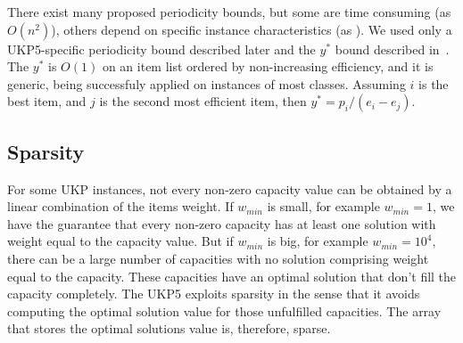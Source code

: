 \documentclass[runningheads,a4paper]{llncs}
\begin{document}
There exist many proposed periodicity bounds, but some are time consuming (as \(O(n^2)\)\cite{badbound1}), others depend on specific instance characteristics (as \cite{badbound2}\cite{pya}).
We used only a UKP5-specific periodicity bound described later and the \(y^{*}\) bound described in~\cite[p. 223]{gar72}.
The \(y^*\) is \(O(1)\) on an item list ordered by non-increasing efficiency,  and it is generic, being successfuly applied on instances of most classes.
Assuming \(i\) is the best item, and \(j\) is the second most efficient item, then \mbox{\(y^{*} = p_i / (e_i - e_j)\)}.

\subsection{Sparsity}


For some UKP instances, not every non-zero capacity value can be obtained by a linear combination of the items weight. 
If \(w_{min}\) is small, for example \(w_{min} = 1\), we have the guarantee that every non-zero capacity has at least one solution with weight equal to the capacity value.
But if \(w_{min}\) is big, for example \(w_{min} = 10^4\), there can be a large number of capacities with no solution comprising weight equal to the capacity. 
These capacities have an optimal solution that don't fill the capacity completely. 
The UKP5 exploits sparsity in the sense that it avoids computing the optimal solution value for those unfulfilled capacities. 
The array that stores the optimal solutions value is, therefore, sparse.
\end{document}
